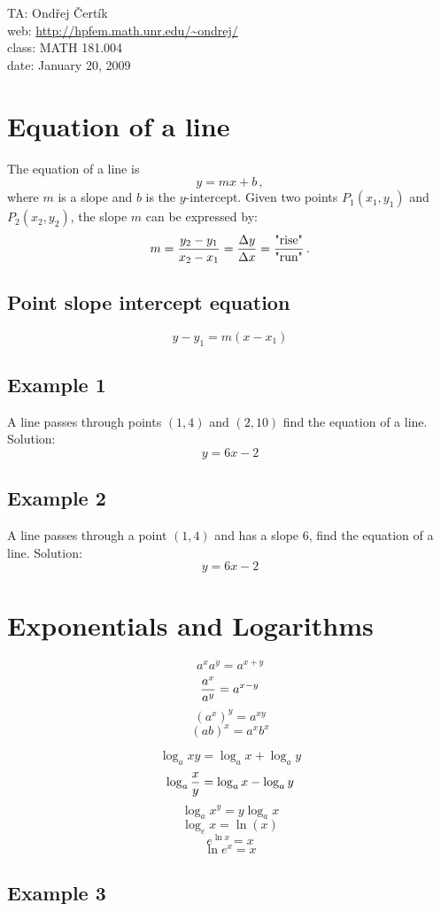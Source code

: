 \documentclass[10pt]{article}
\begin{document}
\noindent TA: Ondřej Čertík\\
web: \url{http://hpfem.math.unr.edu/~ondrej/}\\
class: MATH 181.004\\
date: January 20, 2009

\section{Equation of a line}

The equation of a line is
$$y=mx+b\,,$$
where $m$ is a slope and $b$ is the $y$-intercept. Given two points $P_1(x_1,
y_1)$ and $P_2(x_2, y_2)$, the slope $m$ can be expressed by:
$$m={y_2-y_1\over x_2-x_1}={\Delta y\over\Delta x} = {\mbox{"rise"}\over\mbox{"run"}}\,.$$

\subsection{Point slope intercept equation}

$$y-y_1 = m(x-x_1)$$

\subsection{Example 1}

A line passes through points $(1, 4)$ and $(2, 10)$ find the equation of a
line. Solution:
$$y=6x-2$$

\subsection{Example 2}

A line passes through a point $(1, 4)$ and has a slope 6, find the equation of a
line. Solution:
$$y=6x-2$$

\section{Exponentials and Logarithms}

$$a^xa^y = a^{x+y}$$
$${a^x\over a^y} = a^{x-y}$$
$$(a^x)^y = a^{xy}$$
$$(ab)^x = a^xb^x$$

$$\log_a xy = \log_a x + \log_a y$$
$$\log_a {x\over y} = \log_a x - \log_a y$$
$$\log_a x^y = y\log_a x$$
$$\log_e x = \ln(x)$$
$$e^{\ln x} = x$$
$$\ln e^x=x$$

\subsection{Example 3}
\end{document}
